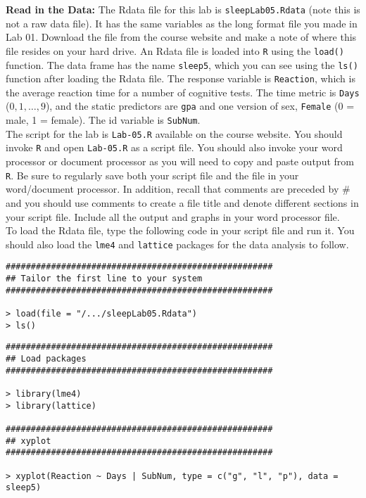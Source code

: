 \documentclass[]{article}
\begin{document}
\noindent\textbf{Read in the Data:} The Rdata file for this lab is \texttt{sleepLab05.Rdata} (note this is not a raw data file). It has the same variables as the long format file you made in Lab 01. Download the file from the course website and make a note of where this file resides on your hard drive. An Rdata file is loaded into \texttt{R} using the \texttt{load()} function. The data frame has the name \texttt{sleep5}, which you can see using the \texttt{ls()} function after loading the Rdata file. The response variable is \texttt{Reaction}, which is the average reaction time for a number of cognitive tests. The time metric is \texttt{Days} ($0,1,\ldots,9$), and the static predictors are \texttt{gpa} and one version of sex, \texttt{Female} (0 = male, 1 = female). The id variable is \texttt{SubNum}.\\
\linebreak
The script for the lab is \texttt{Lab-05.R} available on the course website. You should invoke \texttt{R} and open \texttt{Lab-05.R} as a script file. You should also invoke your word processor or document processor as you will need to copy and paste output from \texttt{R}. Be sure to regularly save both your script file and the file in your word/document processor. In addition, recall that comments are preceded by \# and
you should use comments to create a file title and denote different sections in your script
file. Include all the output and graphs in your word processor file.\\
\linebreak
To load the Rdata file, type the following code in your script file and run it. You should also load the \texttt{lme4} and \texttt{lattice} packages for the data analysis to follow.


\begin{shaded}
\begin{lstlisting}
#####################################################
## Tailor the first line to your system 
#####################################################

> load(file = "/.../sleepLab05.Rdata")
> ls()
\end{lstlisting}
\end{shaded}
\pagebreak
\begin{shaded}
\begin{lstlisting}
#####################################################
## Load packages 
#####################################################

> library(lme4)
> library(lattice)

#####################################################
## xyplot
#####################################################

> xyplot(Reaction ~ Days | SubNum, type = c("g", "l", "p"), data = sleep5)
\end{lstlisting}
\end{shaded}
\end{document}
